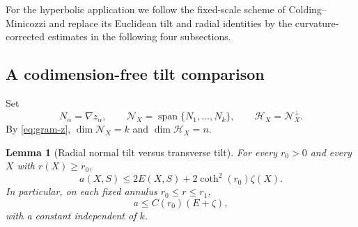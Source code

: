 \documentclass[11pt,reqno]{amsart}
\numberwithin{equation}{section}
\newtheorem{lemma}[lemma]{Lemma}
\theoremstyle{definition}
\theoremstyle{remark}
\begin{document}
For the hyperbolic application we follow the fixed-scale scheme of
Colding--Minicozzi and replace its Euclidean tilt and radial identities by the
curvature-corrected estimates in the following four subsections.

\subsection{A codimension-free tilt comparison}\label{sec:tilt}

Set
\[
 N_\alpha=\nabla z_\alpha,
 \qquad
 \mathcal N_X=\operatorname{span}\{N_1,\dots,N_k\},
 \qquad
 \mathcal H_X=\mathcal N_X^\perp.
\]
By \eqref{eq:gram-z}, $\dim\mathcal N_X=k$ and $\dim\mathcal H_X=n$.

\begin{lemma}[Radial normal tilt versus transverse tilt]\label{lem:tilt-comparison}
For every $r_0>0$ and every $X$ with $r(X)\ge r_0$,
\begin{equation}\label{eq:tilt-comparison}
 a(X,S)\le2E(X,S)+2\coth^2(r_0)\zeta(X).
\end{equation}
In particular, on each fixed annulus $r_0\le r\le r_1$,
\[
 a\le C(r_0)(E+\zeta),
\]
with a constant independent of $k$.
\end{lemma}
\end{document}
